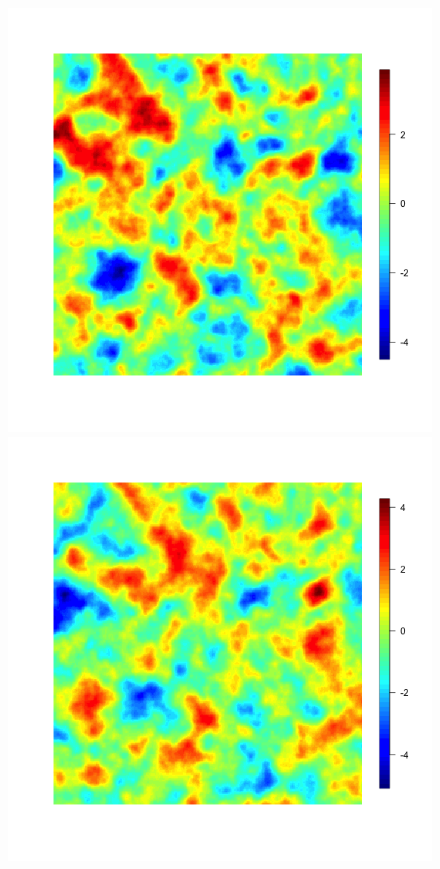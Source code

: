 \documentclass[11pt]{article}
\begin{document}
\begin{figure}
\centering
\includegraphics[scale = .35]{../simu_spatial1.png}
\includegraphics[scale = .35]{../simu_spatial2.png}


\end{figure}
\end{document}
